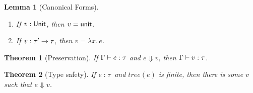 \documentclass[12pt,a2paper,draft]{article}
\newcommand{\abstr}[2]{\ensuremath{\lambda{#1}.\,{#2}}}
\newcommand{\unit}{\ensuremath{\normalfont\textsf{unit}}}
\newcommand{\Unit}{\ensuremath{\normalfont\textsf{Unit}}}
\newcommand{\tj}[2]{\mbox{\ensuremath{{#1}:{#2}}}}
\newcommand{\Tj}[3]{\mbox{\ensuremath{{#1}\vdash\tj{#2}{#3}}}}
\newcommand{\tree}[1]{\mathit{tree}(#1)}
\newtheorem{lemma}{Lemma}
\newtheorem{theorem}{Theorem}
\begin{document}
\begin{lemma}[Canonical Forms] \label{lemma:Canonical_Forms} \
  \begin{enumerate}
  \item If $\tj{v}{\Unit}$, then $v = \unit$.
  \item If $\tj{v}{\tau' \to \tau}$, then $v = \abstr{x}{e}$.
  \end{enumerate}
\end{lemma}

\begin{theorem}[Preservation] \label{theorem:Preservation}
  If $\Tj{\Gamma}{e}{\tau}$ and $e \Downarrow v$, then $\Tj{\Gamma}{v}{\tau}$.
\end{theorem}

\begin{theorem}[Type safety]
  If $\tj{e}{\tau}$ and $\tree{e}$ is finite, then there is some $v$ such that $e \Downarrow v$.
\end{theorem}
\end{document}
